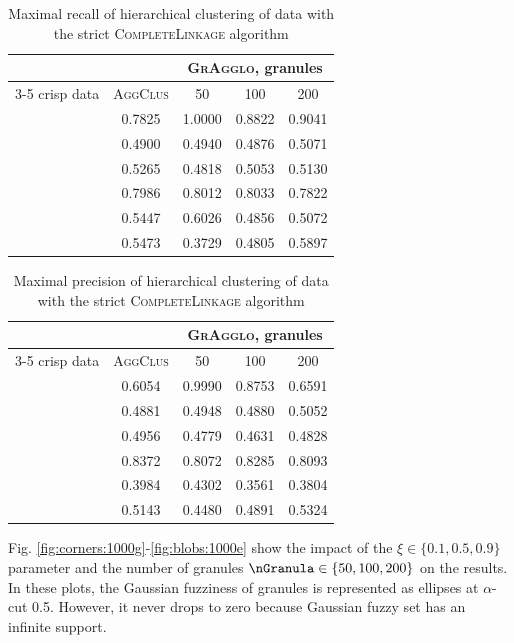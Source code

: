 \documentclass{amcs}
\newcommand{\blobs}{\dataset{blobs}}
\newcommand{\circles}{\dataset{circles}}
\newcommand{\corners}{\dataset{corners}}
\newcommand{\crescents}{\dataset{crescents}}
\newcommand{\laguna}{\dataset{laguna}}
\newcommand{\spheres}{\dataset{spheres}}
\newcommand{\procedura}[1]{\textsc{#1}}
\newcommand{\CompleteLinkage}{\procedura{Com\-ple\-te\-Lin\-ka\-ge}}
\newcommand{\abbrAgglomerativeClustering}{\procedura{AggClus}}
\newcommand{\MojAlg}{\procedura{GrAgglo}}
\begin{document}
\begin{table}
	\centering
   \caption{Maximal recall of hierarchical clustering of data with the strict \CompleteLinkage{} algorithm}
	\label{id:tab:rec-cl-strict}
	\begin{tabular}{lcccc}
		\toprule
		&  & \multicolumn{3}{c}{\MojAlg, granules} \\
		\cmidrule(lr){3-5}
		{crisp data} & \abbrAgglomerativeClustering & 50  & 100  & 200   \\
		\midrule
		\blobs\ & 0.7825 & 1.0000 & 0.8822 & 0.9041 \\
		\circles\ & 0.4900 & 0.4940 & 0.4876 & 0.5071 \\
		\corners\ & 0.5265 & 0.4818 & 0.5053 & 0.5130 \\
		\crescents\ & 0.7986 & 0.8012 & 0.8033 & 0.7822 \\
		\laguna\ & 0.5447 & 0.6026 & 0.4856 & 0.5072 \\
		\spheres\ & 0.5473 & 0.3729 & 0.4805 & 0.5897 \\
		\bottomrule
	\end{tabular}
\end{table}  

\begin{table}
	\centering
   \caption{Maximal precision of hierarchical clustering of data with the strict \CompleteLinkage{} algorithm}
	\label{id:tab:prec-cl-strict}
	\begin{tabular}{lcccc}
		\toprule
		&  & \multicolumn{3}{c}{\MojAlg, granules} \\
		\cmidrule(lr){3-5}
		{crisp data} & \abbrAgglomerativeClustering & 50  & 100  & 200   \\
		\midrule
		\blobs\ & 0.6054 & 0.9990 & 0.8753 & 0.6591 \\
		\circles\ & 0.4881 & 0.4948 & 0.4880 & 0.5052 \\
		\corners\ & 0.4956 & 0.4779 & 0.4631 & 0.4828 \\
		\crescents\ & 0.8372 & 0.8072 & 0.8285 & 0.8093 \\
		\laguna\ & 0.3984 & 0.4302 & 0.3561 & 0.3804 \\
		\spheres\ & 0.5143 & 0.4480 & 0.4891 & 0.5324 \\
		\bottomrule
	\end{tabular}
\end{table}  


Fig. \ref{fig:corners:1000g}-\ref{fig:blobs:1000e} show the impact of the $\xi \in \{0.1, 0.5, 0.9\}$ parameter and the number of granules $\nGranula \in \{50, 100, 200\}$ on the results. 
In these plots, the Gaussian fuzziness of granules is represented as ellipses at $\alpha$-cut 0.5.
However, it never drops to zero because Gaussian fuzzy set has an infinite support. 
\end{document}
